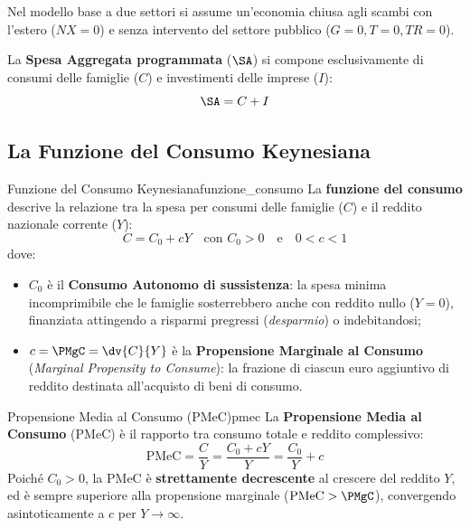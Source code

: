 Nel modello base a due settori si assume un'economia chiusa agli scambi con l'estero ($NX = 0$) e senza intervento del settore pubblico ($G = 0, T = 0, TR = 0$).

La \textbf{Spesa Aggregata programmata} ($\SA$) si compone esclusivamente di consumi delle famiglie ($C$) e investimenti delle imprese ($I$):
\begin{equation}
    \SA = C + I
\end{equation}

\subsection{La Funzione del Consumo Keynesiana}

\begin{definizione}{Funzione del Consumo Keynesiana}{funzione_consumo}
La \textbf{funzione del consumo} descrive la relazione tra la spesa per consumi delle famiglie ($C$) e il reddito nazionale corrente ($Y$):
\begin{equation}
    C = C_0 + c Y \quad \text{con } C_0 > 0 \quad \text{e} \quad 0 < c < 1
\end{equation}
dove:
\begin{itemize}
    \item $C_0$ è il \textbf{Consumo Autonomo di sussistenza}: la spesa minima incomprimibile che le famiglie sosterrebbero anche con reddito nullo ($Y = 0$), finanziata attingendo a risparmi pregressi (\textit{desparmio}) o indebitandosi;
    \item $c = \PMgC = \dv{C}{Y}$ è la \textbf{Propensione Marginale al Consumo} (\textit{Marginal Propensity to Consume}): la frazione di ciascun euro aggiuntivo di reddito destinata all'acquisto di beni di consumo.
\end{itemize}
\end{definizione}

\begin{definizione}{Propensione Media al Consumo (PMeC)}{pmec}
La \textbf{Propensione Media al Consumo} ($\mathrm{PMeC}$) è il rapporto tra consumo totale e reddito complessivo:
\begin{equation}
    \mathrm{PMeC} = \frac{C}{Y} = \frac{C_0 + cY}{Y} = \frac{C_0}{Y} + c
\end{equation}
Poiché $C_0 > 0$, la $\mathrm{PMeC}$ è \textbf{strettamente decrescente} al crescere del reddito $Y$, ed è sempre superiore alla propensione marginale ($\mathrm{PMeC} > \PMgC$), convergendo asintoticamente a $c$ per $Y \to \infty$.
\end{definizione}


